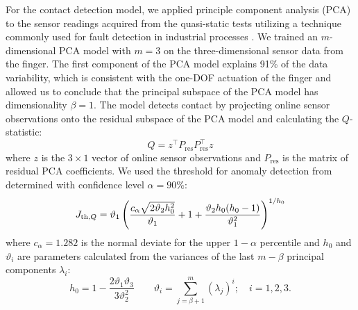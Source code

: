 For the contact detection model, we applied principle component analysis (PCA) to the sensor readings acquired from the quasi-static tests utilizing a technique commonly used for fault detection in industrial processes \cite{Yin2014}. We trained an $m$-dimensional PCA model with $m=3$ on the three-dimensional sensor data from the finger. The first component of the PCA model explains 91\% of the data variability, which is consistent with the one-DOF actuation of the finger and allowed us to conclude that the principal subspace of the PCA model has dimensionality $\beta=1$. The model detects contact by projecting online sensor observations onto the residual subspace of the PCA model and calculating the $Q$-statistic:
\begin{equation}\label{eq:SPE}
    Q=z^\top P_\textrm{res} P_\textrm{res}^\top z
\end{equation}
where $z$ is the $3\times 1$ vector of online sensor observations and $P_\textrm{res}$ is the matrix of residual PCA coefficients. We used the threshold for anomaly detection from \cite{Yin2014} determined with confidence level $\alpha=\text{90\%}$:
\begin{equation}\label{eq:J_th}
    J_{{\rm th,} Q} = \vartheta_{1}\left(\frac{c_{\alpha}\sqrt{2\vartheta_{2}h_{0}^{2}}}{\vartheta_{1}} + 1 + \frac{\vartheta_{2}h_{0}(h_{0} - 1)}{ \vartheta_{1}^{2}}\right)^{1/ h_{0}}
\end{equation}
where $c_\alpha=1.282$ is the normal deviate for the upper $1-\alpha$ percentile and $h_0$ and $\vartheta_i$ are parameters calculated from the variances of the last $m-\beta$ principal components $\lambda_i$:
$$h_{0} = 1 - \frac{2\vartheta_{1}\vartheta_{3}}{3\vartheta_{2}^{2}} \qquad \vartheta_{i} = \sum_{j = \beta + 1}^{m}(\lambda_{j})^{i}; \quad i = 1, 2, 3.$$

